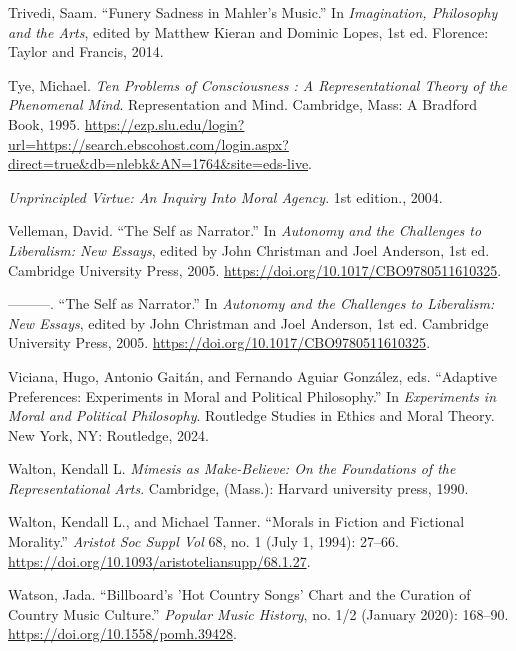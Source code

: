 \documentclass[phdthesis,12pt,final]{wuthesis}
\newlength{\cslhangindent}
\newenvironment{CSLReferences}[2] %
{\begin{list}{}{%
	\setlength{\itemindent}{0pt}
	\setlength{\leftmargin}{0pt}
	\setlength{\parsep}{0pt}
	\ifodd #1
	\setlength{\leftmargin}{\cslhangindent}
	\setlength{\itemindent}{-1\cslhangindent}
	\fi
	\setlength{\itemsep}{#2\baselineskip}}}
{\end{list}}
\theoremstyle{definition}
\theoremstyle{definition}
\theoremstyle{definition}
\theoremstyle{definition}
\theoremstyle{remark}
\begin{document}
\begin{CSLReferences}{1}{0}
Trivedi, Saam. {``Funery {Sadness} in {Mahler}'s {Music}.''} In \emph{Imagination, {Philosophy} and the {Arts}}, edited by Matthew Kieran and Dominic Lopes, 1st ed. Florence: {Taylor and Francis}, 2014.

Tye, Michael. \emph{Ten {Problems} of {Consciousness} : {A Representational Theory} of the {Phenomenal Mind}}. Representation and {Mind}. Cambridge, Mass: A Bradford Book, 1995. \url{https://ezp.slu.edu/login?url=https://search.ebscohost.com/login.aspx?direct=true&db=nlebk&AN=1764&site=eds-live}.

\emph{Unprincipled {Virtue}: {An Inquiry Into Moral Agency}}. 1st edition., 2004.

Velleman, David. {``The {Self} as {Narrator}.''} In \emph{Autonomy and the {Challenges} to {Liberalism}: {New Essays}}, edited by John Christman and Joel Anderson, 1st ed. Cambridge University Press, 2005. \url{https://doi.org/10.1017/CBO9780511610325}.

---------. {``The {Self} as {Narrator}.''} In \emph{Autonomy and the {Challenges} to {Liberalism}: {New Essays}}, edited by John Christman and Joel Anderson, 1st ed. Cambridge University Press, 2005. \url{https://doi.org/10.1017/CBO9780511610325}.

Viciana, Hugo, Antonio Gaitán, and Fernando Aguiar González, eds. {``Adaptive {Preferences}: {Experiments} in {Moral} and {Political Philosophy}.''} In \emph{Experiments in Moral and Political Philosophy}. Routledge Studies in Ethics and Moral Theory. New York, NY: Routledge, 2024.

Walton, Kendall L. \emph{Mimesis as {Make-Believe}: {On} the {Foundations} of the {Representational Arts}}. Cambridge, (Mass.): Harvard university press, 1990.

Walton, Kendall L., and Michael Tanner. {``Morals in {Fiction} and {Fictional Morality}.''} \emph{Aristot Soc Suppl Vol} 68, no. 1 (July 1, 1994): 27--66. \url{https://doi.org/10.1093/aristoteliansupp/68.1.27}.

Watson, Jada. {``Billboard's '{Hot Country Songs}' Chart and the Curation of Country Music Culture.''} \emph{Popular Music History}, no. 1/2 (January 2020): 168--90. \url{https://doi.org/10.1558/pomh.39428}.


\end{CSLReferences}
\end{document}
